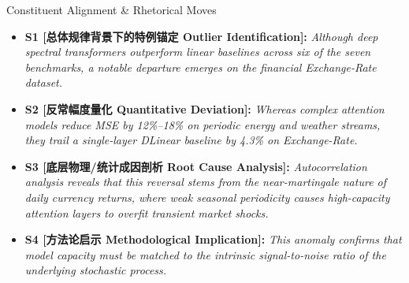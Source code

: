 \begin{TipBox}{Constituent Alignment \& Rhetorical Moves}
\begin{itemize}[leftmargin=1.5em]
  \item \textbf{S1 [总体规律背景下的特例锚定 Outlier Identification]:} \textit{Although deep spectral transformers outperform linear baselines across six of the seven benchmarks, a notable departure emerges on the financial Exchange-Rate dataset.}\par{}
  \item \textbf{S2 [反常幅度量化 Quantitative Deviation]:} \textit{Whereas complex attention models reduce MSE by 12\%--18\% on periodic energy and weather streams, they trail a single-layer DLinear baseline by 4.3\% on Exchange-Rate.}\par{}
  \item \textbf{S3 [底层物理/统计成因剖析 Root Cause Analysis]:} \textit{Autocorrelation analysis reveals that this reversal stems from the near-martingale nature of daily currency returns, where weak seasonal periodicity causes high-capacity attention layers to overfit transient market shocks.}\par{}
  \item \textbf{S4 [方法论启示 Methodological Implication]:} \textit{This anomaly confirms that model capacity must be matched to the intrinsic signal-to-noise ratio of the underlying stochastic process.}\par{}
\end{itemize}
\end{TipBox}
\bigskip
